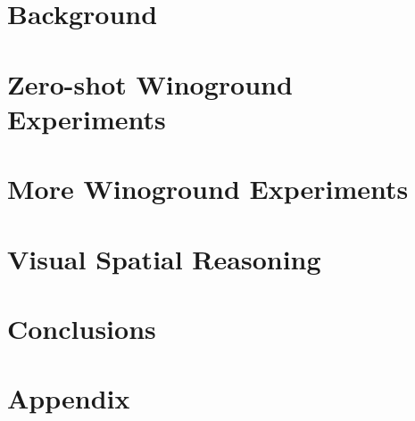 \documentclass[a4paper, 11pt]{memoir}
\begin{document}
\chapter{Background} \label{cha:2_related_work}

\cleardoublepage

\chapter{Zero-shot Winoground Experiments} \label{cha:4_winoground}

\cleardoublepage

\chapter{More Winoground Experiments} \label{cha:5_experiments}

\cleardoublepage

\chapter{Visual Spatial Reasoning} \label{cha:6_visual_spatial_reasoning}

\cleardoublepage

\chapter{Conclusions} \label{cha:7_conclusions}

\cleardoublepage


\backmatter
\appendix

\chapter{Appendix} \label{cha:appendix}




\end{document}
